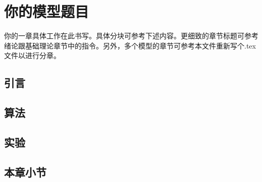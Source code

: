 \documentclass[../main.tex]{subfiles}
\begin{document}
\chapter{你的模型题目}\label{cha-fi}

你的一章具体工作在此书写。具体分块可参考下述内容。更细致的章节标题可参考绪论跟基础理论章节中的指令。另外，多个模型的章节可参考本文件重新写个.tex文件以进行分章。

\section{引言}


\section{算法}


\section{实验}


\section{本章小节}
\end{document}
